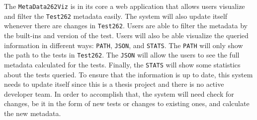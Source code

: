 \documentclass[runningheads]{llncs}
\begin{document}

The \texttt{MetaData262Viz} is in its core a web application that allows users visualize and filter the \texttt{Test262} metadata easily. The system will also update itself whenever there are changes in \texttt{Test262}. Users are able to filter the metadata by the built-ins and version of the test. Users will also be able visualize the queried information in different ways: \texttt{PATH}, \texttt{JSON}, and \texttt{STATS}. The \texttt{PATH} will only show the path to the tests in \texttt{Test262}. The \texttt{JSON} will allow the users to see the full metadata calculated for the tests. Finally, the \texttt{STATS} will show some statistics about the tests queried. To ensure that the information is up to date, this system needs to update itself since this is a thesis project and there is no active developer team. In order to accomplish that, the system will need check for changes, be it in the form of new tests or changes to existing ones, and calculate the new metadata.
\end{document}
